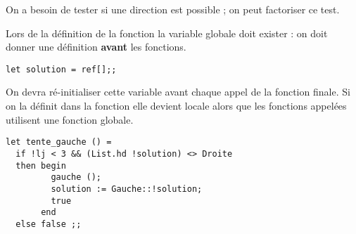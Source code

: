 \begin{Exercise} 
On a besoin de tester si une direction est possible ; on peut factoriser ce test.

Lors de la définition de la fonction la variable globale  doit exister : on doit donner une définition {\bf avant} les fonctions.
\begin{lstlisting} 
let solution = ref[];;
\end{lstlisting} 
On devra ré-initialiser cette variable avant chaque appel de la fonction finale. Si on la définit dans la fonction elle devient locale alors que les fonctions appelées utilisent une fonction globale.
\begin{lstlisting} 
let tente_gauche () =
  if !lj < 3 && (List.hd !solution) <> Droite
  then begin
         gauche (); 
         solution := Gauche::!solution; 
         true
       end
  else false ;;
  \end{lstlisting} 
\end{Exercise}
